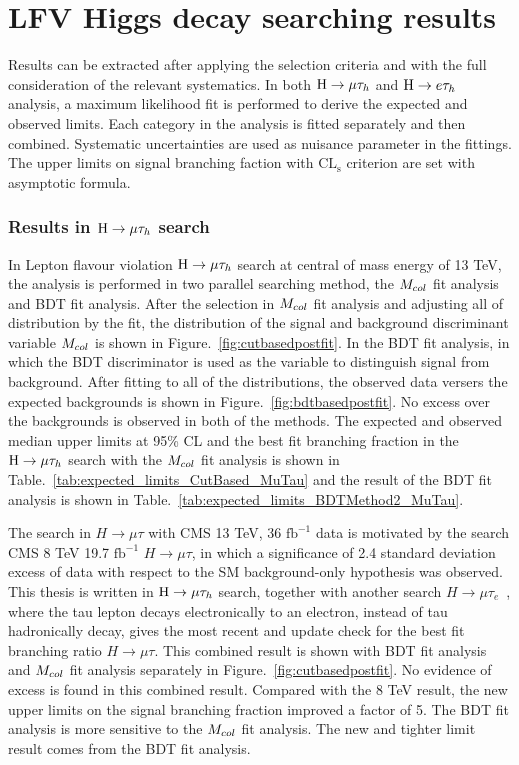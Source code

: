\chapter{LFV Higgs decay searching results}

Results can be extracted after applying the selection criteria and with the full consideration of the relevant systematics.  In both $\mathrm{H}\to \mu\tau_{h}$ and $\mathrm{H} \to e \tau_{h}$ analysis, a maximum likelihood fit is performed to derive the expected and observed limits.  Each category in the analysis is fitted separately and then combined. Systematic uncertainties are used as nuisance parameter in the fittings.  The upper limits on signal branching faction with $\textrm{CL}_{\textrm{s}}$ criterion are set with asymptotic formula. 

\subsection{Results in $\mathrm{H}\to \mu\tau_{h}$ search}

In Lepton flavour violation $\mathrm{H}\to \mu\tau_{h}$ search at central of mass energy of 13 TeV, the analysis is performed in two parallel searching method, the $M_{col}$ fit analysis and BDT fit analysis. After the selection in $M_{col}$ fit analysis and adjusting all of distribution by the fit,  the distribution of the signal and background discriminant variable $M_{col}$ is shown in Figure.~\ref{fig:cutbasedpostfit}. In the BDT fit analysis, in which the BDT discriminator is used as the variable to distinguish signal from background.  After fitting to all of the distributions, the observed data versers the expected backgrounds is shown in Figure.~\ref{fig:bdtbasedpostfit}. No excess over the backgrounds is observed in both of the methods. The expected and observed median upper limits at 95\% CL and the best fit branching fraction in the $\mathrm{H}\to \mu\tau_{h}$ search with the $M_{col}$ fit analysis is shown in Table.~\ref{tab:expected_limits_CutBased_MuTau}  and the result of the BDT fit analysis is shown in Table.~\ref{tab:expected_limits_BDTMethod2_MuTau}. 

The search in $H \to \mu \tau$ with CMS 13 TeV, 36 $\textrm{fb}^{-1}$ data is motivated by the search CMS 8 TeV 19.7 $\textrm{fb}^{-1}$ $H \to \mu \tau$, in which a significance of 2.4 standard deviation excess of data with respect to the SM background-only hypothesis was observed. This thesis is written in $\mathrm{H}\to \mu\tau_{h}$ search, together with another search $H \to \mu\tau_{e}$~\cite{paper:13TeVsearch}, where the tau lepton decays electronically to an electron, instead of tau hadronically decay, gives the most recent and update check for the best fit branching ratio $H \to \mu \tau$. This combined result is shown with BDT fit analysis and $M_{col}$ fit analysis separately in Figure.~\ref{fig:cutbasedpostfit}. No evidence of excess is found in this combined result. Compared with the 8 TeV result, the new upper limits on the signal branching fraction improved a factor of 5. The BDT fit analysis is more sensitive to the $M_{col}$ fit analysis. The new and tighter limit result comes from the BDT fit analysis.  



